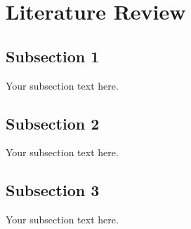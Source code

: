 \chapter{Literature Review}
\section{Subsection 1}
Your subsection text here.
\section{Subsection 2}
Your subsection text here.
\section{Subsection 3}
Your subsection text here.

